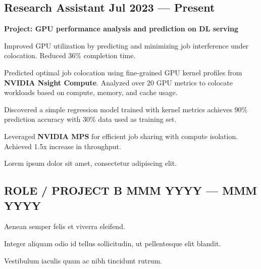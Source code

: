 \subsection{{Research Assistant \hfill Jul 2023 --- Present}}

\begin{zitemize}
        \item \textbf{Project: GPU performance analysis and prediction on DL serving}
        \item Improved GPU utilization by predicting and minimizing job interference under colocation. Reduced 36\% completion time. 
        \item Predicted optimal job colocation using fine-grained GPU kernel profiles from \textbf{NVIDIA Nsight Compute}. Analyzed over 20 GPU metrics to colocate workloads based on compute, memory, and cache usage.
        \item Discovered a simple regression model trained with kernel metrics achieves 90\% prediction accuracy with 30\% data used as training set.
        \item Leveraged \textbf{NVIDIA MPS} for efficient job sharing with compute isolation. Achieved 1.5x increase in throughput.
\end{zitemize}

\begin{zitemize}
\item Lorem ipsum dolor sit amet, consectetur adipiscing elit.
\end{zitemize}


\subsection{{ROLE / PROJECT B \hfill MMM YYYY --- MMM YYYY}}
\begin{zitemize}
\item Aenean semper felis et viverra eleifend.
\item Integer aliquam odio id tellus sollicitudin, ut pellentesque elit blandit.
\item Vestibulum iaculis quam ac nibh tincidunt rutrum.
\end{zitemize}

